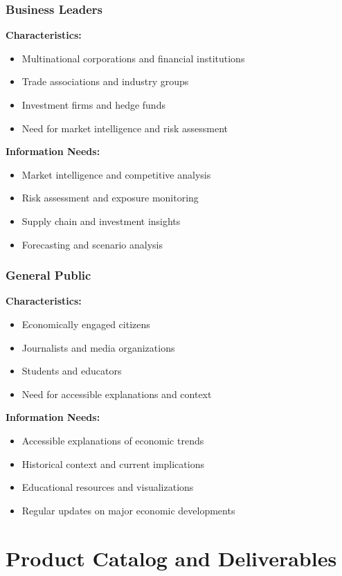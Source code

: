\documentclass[11pt,a4paper]{article}
\begin{document}
\subsubsection{Business Leaders}
\textbf{Characteristics:}
\begin{itemize}
    \item Multinational corporations and financial institutions
    \item Trade associations and industry groups
    \item Investment firms and hedge funds
    \item Need for market intelligence and risk assessment
\end{itemize}

\textbf{Information Needs:}
\begin{itemize}
    \item Market intelligence and competitive analysis
    \item Risk assessment and exposure monitoring
    \item Supply chain and investment insights
    \item Forecasting and scenario analysis
\end{itemize}

\subsubsection{General Public}
\textbf{Characteristics:}
\begin{itemize}
    \item Economically engaged citizens
    \item Journalists and media organizations
    \item Students and educators
    \item Need for accessible explanations and context
\end{itemize}

\textbf{Information Needs:}
\begin{itemize}
    \item Accessible explanations of economic trends
    \item Historical context and current implications
    \item Educational resources and visualizations
    \item Regular updates on major economic developments
\end{itemize}

\section{Product Catalog and Deliverables}
\end{document}
